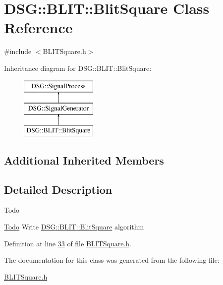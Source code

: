 \hypertarget{class_d_s_g_1_1_b_l_i_t_1_1_blit_square}{\section{D\+S\+G\+:\+:B\+L\+I\+T\+:\+:Blit\+Square Class Reference}
\label{class_d_s_g_1_1_b_l_i_t_1_1_blit_square}
}


{\ttfamily \#include $<$B\+L\+I\+T\+Square.\+h$>$}

Inheritance diagram for D\+S\+G\+:\+:B\+L\+I\+T\+:\+:Blit\+Square\+:\begin{figure}[H]
\begin{center}
\leavevmode
\includegraphics[height=3.000000cm]{class_d_s_g_1_1_b_l_i_t_1_1_blit_square}
\end{center}
\end{figure}
\subsection*{Additional Inherited Members}


\subsection{Detailed Description}
\begin{DoxyRefDesc}{Todo}
\item[\hyperlink{todo__todo000003}{Todo}]Write \hyperlink{class_d_s_g_1_1_b_l_i_t_1_1_blit_square}{D\+S\+G\+::\+B\+L\+I\+T\+::\+Blit\+Square} algorithm \end{DoxyRefDesc}


Definition at line \hyperlink{_b_l_i_t_square_8h_source_l00033}{33} of file \hyperlink{_b_l_i_t_square_8h_source}{B\+L\+I\+T\+Square.\+h}.



The documentation for this class was generated from the following file\+:\begin{DoxyCompactItemize}
\item 
\hyperlink{_b_l_i_t_square_8h}{B\+L\+I\+T\+Square.\+h}\end{DoxyCompactItemize}
